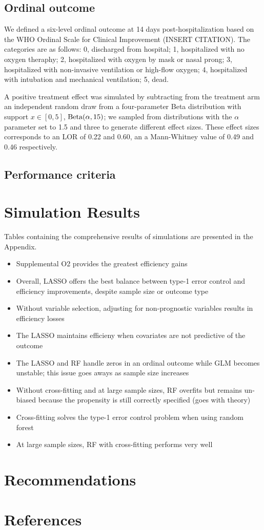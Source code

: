 \documentclass{article}
\begin{document}
\subsection{Ordinal outcome}

We defined a six-level ordinal outcome at 14 days post-hospitalization based on the WHO Ordinal Scale for Clinical Improvement (INSERT CITATION). The categories are as follows: 0, discharged from hospital; 1, hospitalized with no oxygen theraphy; 2, hospitalized with oxygen by mask or nasal prong; 3, hospitalized with non-invasive ventilation or high-flow oxygen; 4, hospitalized with intubation and mechanical ventilation; 5, dead.

A positive treatment effect was simulated by subtracting from the treatment arm an independent random draw from a four-parameter Beta distribution with support $x \in [0, 5]$, $\textnormal{Beta}(\alpha, 15)$; we sampled from distributions with the $\alpha$ parameter set to 1.5 and three to generate different effect sizes. These effect sizes corresponds to an LOR of 0.22 and 0.60, an a Mann-Whitney value of 0.49 and 0.46 respectively. 

\subsection{Performance criteria}

\section{Simulation Results}

Tables containing the comprehensive results of simulations are presented in the Appendix.

\begin{itemize}
  \item Supplemental O2 provides the greatest efficiency gains
  \item Overall, LASSO offers the best balance between type-1 error control and efficiency improvements, despite sample size or outcome type
  \item Without variable selection, adjusting for non-prognostic variables results in efficiency losses
  \item The LASSO maintains efficieny when covariates are not predictive of the outcome
  \item The LASSO and RF handle zeros in an ordinal outcome while GLM becomes unstable; this issue goes aways as sample size increases
  \item Without cross-fitting and at large sample sizes, RF overfits but remains un-biased because the propensity is still correctly specified (goes with theory)
  \item Cross-fitting solves the type-1 error control problem when using random forest
  \item At large sample sizes, RF with cross-fitting performs very well
\end{itemize}

\section{Recommendations}

\section{References}



\appendix
\end{document}

